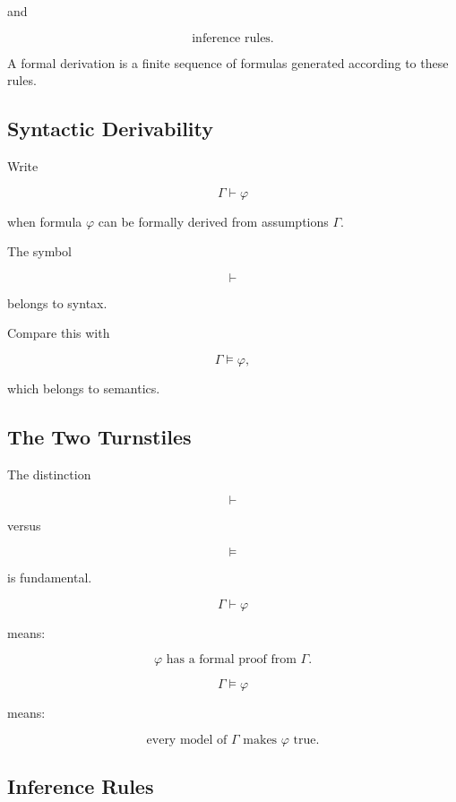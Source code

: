 and

\[
\boxed{
\text{inference rules}.
}
\]

A formal derivation is a finite sequence of formulas generated according
to these rules.

\subsection{Syntactic Derivability}
\label{subsec:syntactic-derivability}

Write

\[
\boxed{
\Gamma\vdash\varphi
}
\]

when formula \(\varphi\) can be formally derived from assumptions
\(\Gamma\).

The symbol

\[
\vdash
\]

belongs to syntax.

Compare this with

\[
\boxed{
\Gamma\models\varphi,
}
\]

which belongs to semantics.

\subsection{The Two Turnstiles}
\label{subsec:two-turnstiles}

The distinction

\[
\boxed{
\vdash
}
\]

versus

\[
\boxed{
\models
}
\]

is fundamental.

\[
\Gamma\vdash\varphi
\]

means:

\[
\boxed{
\text{\(\varphi\) has a formal proof from \(\Gamma\).}
}
\]

\[
\Gamma\models\varphi
\]

means:

\[
\boxed{
\text{every model of \(\Gamma\) makes \(\varphi\) true.}
}
\]

\subsection{Inference Rules}
\label{subsec:formal-inference-rules}

